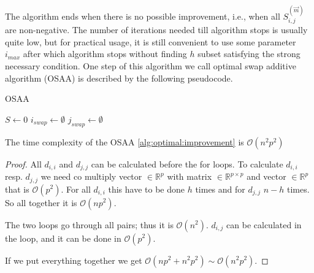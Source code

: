 The algorithm ends when there is no possible improvement, i.e., when all $S^{(\vec{m})}_{i,j}$ are non-negative.
The number of iterations needed till algorithm stops is usually quite low, but for practical usage, it is still convenient to use some parameter $i_{max}$ after which algorithm stops without finding $h$ subset satisfying the strong necessary condition. 
One step of this algorithm we call optimal swap additive algorithm (OSAA) is described by the following pseudocode.

\begin{algorithm}[H]
    \label{alg:optimal:improvement}
    \caption{OSAA}
    
    $S \gets 0$\;
    $i_{swap} \gets \emptyset$\;
    $j_{swap} \gets \emptyset$\;

    \;
\end{algorithm}



\begin{observation} 
     The time complexity of the OSAA \ref{alg:optimal:improvement} is $\mathcal{O}(n^2p^2)$
\end{observation} 


\begin{proof}
All $d_{i,i}$ and $d_{j,j}$ can be calculated before the for loops. 
To calculate $d_{i,i}$ resp. $d_{j,j}$ we need co multiply vector $\in \mathbb{R}^p$ with matrix  $\in \mathbb{R}^{p \times p}$ and vector $\in \mathbb{R}^p$ that is $\mathcal{O}(p^2)$. For all $d_{i,i}$ this have to be done $h$ times and for $d_{j,j}$ $n-h$ times. So all together it is $\mathcal{O}(np^2)$. 

The two loops go through all pairs; thus it is $\mathcal{O}(n^2)$. $d_{i,j}$ can be calculated in the loop, and it can be done in $\mathcal{O}(p^2)$.

If we put everything together we get 
$\mathcal{O}(np^2 + n^2p^2) \sim \mathcal{O}(n^2p^2)$.
\end{proof}


